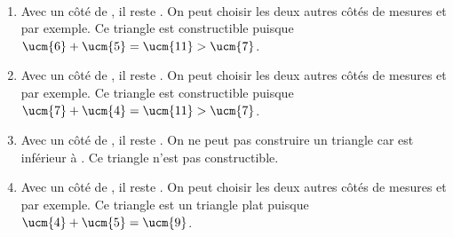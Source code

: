    \ \\ [-5mm]
   \begin{enumerate}
      \item Avec un côté de , il reste . On peut choisir les deux autres côtés de mesures  et  par exemple. {\blue Ce triangle est  constructible} puisque $\ucm{6}+\ucm{5} =\ucm{11} >\ucm{7}$. \smallskip
      \item Avec un côté de , il reste . On peut choisir les deux autres côtés de mesures  et  par exemple. {\blue Ce triangle est constructible} puisque $\ucm{7}+\ucm{4} =\ucm{11} >\ucm{7}$. \smallskip
      \item Avec un côté de , il reste . On ne peut pas construire un triangle car  est inférieur à . {\blue Ce triangle n'est pas constructible}. \smallskip
      \item Avec un côté de , il reste . On peut choisir les deux autres côtés de mesures  et  par exemple. {\blue Ce triangle est un triangle plat} puisque $\ucm{4}+\ucm{5} =\ucm{9}$.
   \end{enumerate}

